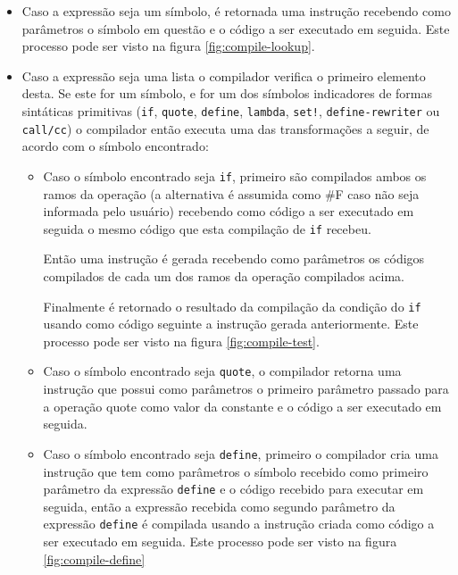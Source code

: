 \begin{itemize}

\item Caso a expressão seja um símbolo, é retornada uma instrução  
recebendo como parâmetros o símbolo em questão e o código a ser executado em
seguida. Este processo pode ser visto na figura \ref{fig:compile-lookup}.

\item Caso a expressão seja uma lista o compilador verifica o primeiro elemento
desta. Se este for um símbolo, e for um dos símbolos indicadores de formas
sintáticas primitivas (\texttt{if}, \texttt{quote}, \texttt{define},
\texttt{lambda}, \texttt{set!}, \texttt{define-rewriter} ou \texttt{call/cc}) o 
compilador então executa uma das transformações a seguir, de acordo com o 
símbolo encontrado:
\begin{itemize}
 
 \item Caso o símbolo encontrado seja \texttt{if}, primeiro são compilados
 ambos os ramos da operação (a alternativa é assumida como \#F caso não seja
 informada pelo usuário) recebendo como código a ser executado em seguida o
 mesmo código que esta compilação de \texttt{if} recebeu. 
 
 Então uma instrução  é gerada recebendo como parâmetros os códigos
 compilados de cada um dos ramos da operação compilados acima. 
 
 Finalmente é
 retornado o resultado da compilação da condição do \texttt{if} usando como
 código seguinte a instrução  gerada anteriormente. Este processo
 pode ser visto na figura \ref{fig:compile-test}.  
 
 \item Caso o símbolo encontrado seja \texttt{quote}, o compilador retorna uma
 instrução  que possui como parâmetros o primeiro parâmetro 
 passado para a operação quote como valor da constante e o código a ser
 executado em seguida.
 
 \item Caso o símbolo encontrado seja \texttt{define}, primeiro o compilador
 cria uma instrução  que tem como parâmetros o símbolo recebido como
 primeiro parâmetro da expressão \texttt{define} e o código recebido para
 executar em seguida, então a expressão recebida como segundo parâmetro da
 expressão \texttt{define} é compilada usando a instrução  criada
 como código a ser executado em seguida. Este processo pode ser visto na figura
 \ref{fig:compile-define}
 

\end{itemize}
\end{itemize}

